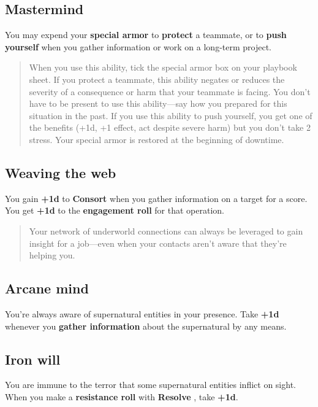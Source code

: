 \documentclass[11pt,fleqn,a5paper]{book}
\newcommand{\gameterm}[1]{\textbf{#1}}
\begin{document}
\subsection{Mastermind}

You may expend your \textbf{special armor} to \textbf{protect} a teammate, or to \textbf{push yourself} when you gather information or work on a long-term project.

\begin{quote}
	When you use this ability, tick the special armor box on your playbook sheet. If you protect a teammate, this ability negates or reduces the severity of a consequence or harm that your teammate is facing. You don’t have to be present to use this ability---say how you prepared for this situation in the past. If you use this ability to push yourself, you get one of the benefits (+1d, +1 effect, act despite severe harm) but you don’t take 2 stress. Your special armor is restored at the beginning of downtime.
\end{quote} 

\subsection{Weaving the web}

You gain \textbf{+1d} to \gameterm{Consort}  when you gather information on a target for a score. You get \textbf{+1d} to the \textbf{engagement roll} for that operation.

\begin{quote}
	Your network of underworld connections can always be leveraged to gain insight for a job---even when your contacts aren’t aware that they’re helping you.
\end{quote} 

\subsection{Arcane mind}

You’re always aware of supernatural entities in your presence. Take \textbf{+1d} whenever you \textbf{gather information} about the supernatural by any means.

\subsection{Iron will}

You are immune to the terror that some supernatural entities inflict on sight. When you make a \textbf{resistance roll }with \gameterm{Resolve} , take \textbf{+1d}.
\end{document}
